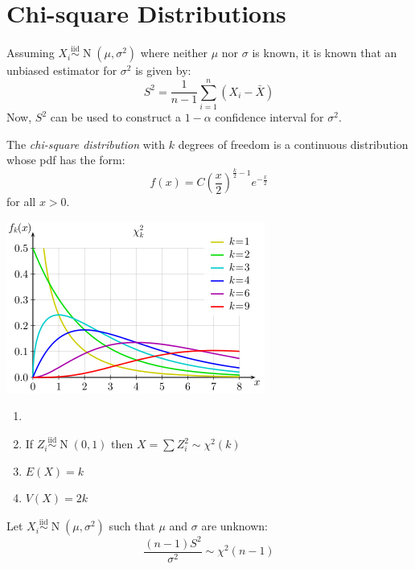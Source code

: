 \documentclass[letterpaper,12pt,fleqn]{article}
\newcommand{\X}{\chi}
\newcommand{\Xs}{\X^2}
\newcommand{\m}{\mu}
\renewcommand{\o}{\sigma}
\renewcommand{\a}{\alpha}
\newcommand{\iid}{\overset{\text{iid}}{\sim}}
\DeclareMathOperator{\nd}{N}
\begin{document}
\section*{Chi-square Distributions}

Assuming \(X_i\iid\nd(\m,\o^2)\) where neither \(\m\) nor \(\o\) is known, it is known that an unbiased estimator for
\(\o^2\) is given by:
\[S^2=\frac{1}{n-1}\sum_{i=1}^n(X_i-\bar{X})\]
Now, \(S^2\) can be used to construct a \(1-\a\) confidence interval for \(\o^2\).

\begin{definition}
  The \emph{chi-square distribution} with \(k\) degrees of freedom is a continuous distribution whose pdf has the form:
  \[f(x)=C\left(\frac{x}{2}\right)^{\frac{k}{2}-1}e^{-\frac{x}{2}}\]
  for all \(x>0\).
\end{definition}

\begin{properties}
  \begin{minipage}[t]{3in}
    \vspace{0pt}
    \includegraphics[scale=0.6]{x2dist.png}
  \end{minipage}
  \begin{minipage}[t]{3.5in}
    \begin{enumerate}
    \setlength{\itemsep}{5pt}
    \item[]
    \item If \(Z_i\iid\nd(0,1)\) then \(X=\sum Z_i^2\sim\Xs(k)\)
    \item \(E(X)=k\)
    \item \(V(X)=2k\)
    \end{enumerate}
  \end{minipage}
\end{properties}

\begin{theorem}
  Let \(X_i\iid\nd(\m,\o^2)\) such that \(\m\) and \(\o\) are unknown:
  \[\frac{(n-1)S^2}{\o^2}\sim\Xs(n-1)\]
\end{theorem}
\end{document}
